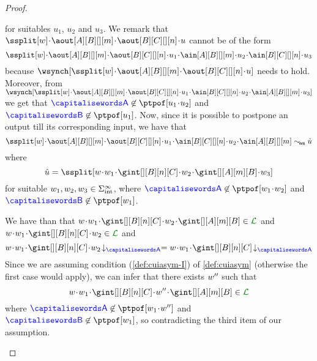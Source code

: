 \begin{proof}
\begin{description}
for suitables $u_1$, $u_2$ and $u_3$.
We remark that $\ssplit[\acword]\cat\aout[A][B][][m]\cat\aout[B][C][][n]\cat u$  cannot be
of the form  $$\ssplit[\acword]\cat\aout[A][B][][m]\cat\aout[B][C][][n]\cat u_1\cat\ain[A][B][][m]\cat u_2\cat\ain[B][C][][n]\cat u_3$$
because $\wsynch[{\ssplit[\acword]\cat\aout[A][B][][m]\cat\aout[B][C][][n]\cat u}]$ needs to hold.\\
Moreover, from $\wsynch[{\ssplit[\acword]\cat\aout[A][B][][m]\cat\aout[B][C][][n]\cat u_1\cat\ain[B][C][][n]\cat u_2\cat\ain[A][B][][m]\cat u_3}]$ we get that
$\p\not\in\ptpof[u_1\cat u_2]$ and $\q\not\in\ptpof[u_1]$.
Now, since it is possible to postpone an output till its corresponding input, we have that
$$\ssplit[\acword]\cat\aout[A][B][][m]\cat\aout[B][C][][n]\cat u_1\cat\ain[B][C][][n]\cat u_2\cat\ain[A][B][][m]\commds \hat u$$
 where 
$$\hat u=\ssplit[{\acword\cat\acword_1\cat\gint[][B][n][C]\cat\acword_2\cat\gint[][A][m][B]\cat\acword_3}]$$ for suitable
 $w_1,w_2,w_3\in\Sigma_{\text{int}}^\infty$,
  where $\p\not\in\ptpof[\acword_1\cat\acword_2]$ and $\q\not\in\ptpof[\acword_1]$.
 
 We have than that $\acword\cat\acword_1\cat\gint[][B][n][C]\cat\acword_2\cat\gint[][A][m][B]\in\clang$ and $\acword\cat\acword_1\cat\gint[][B][n][C]\cat\acword_2\in\clang$ and
 $$\proj{\acword\cat\acword_1\cat\gint[][B][n][C]\cat\acword_2}{A}
 =
 \proj{\acword\cat\acword_1\cat\gint[][B][n][C]}{A}
 $$
 Since we are assuming condition (\ref{def:cuiasym-I}) of \cref{def:cuiasym}
 (otherwise the first case would apply), we can infer that there exists $w''$ such that
 $$\acword\cat\acword_1\cat\gint[][B][n][C]\cat\acword''\cat\gint[][A][m][B]\in\clang$$
 where $\p\not\in\ptpof[\acword_1\cat\acword'']$ and $\q\not\in\ptpof[\acword_1]$, so contradicting the third item of our assumption.
 
 
%
% 
% 
% 
%
 


\end{description}
\end{proof}
